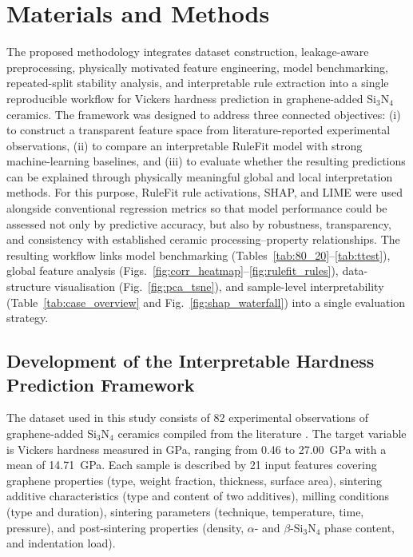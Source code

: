 \documentclass[pdflatex,sn-mathphys-num]{sn-jnl}%
\theoremstyle{thmstyleone}%
\theoremstyle{thmstyletwo}%
\theoremstyle{thmstylethree}%
\begin{document}
\section{Materials and Methods}
The proposed methodology integrates dataset construction, leakage-aware preprocessing, physically motivated feature engineering, model benchmarking, repeated-split stability analysis, and interpretable rule extraction into a single reproducible workflow for Vickers hardness prediction in graphene-added Si$_3$N$_4$ ceramics. The framework was designed to address three connected objectives: (i) to construct a transparent feature space from literature-reported experimental observations, (ii) to compare an interpretable RuleFit model with strong machine-learning baselines, and (iii) to evaluate whether the resulting predictions can be explained through physically meaningful global and local interpretation methods. For this purpose, RuleFit rule activations, SHAP, and LIME were used alongside conventional regression metrics so that model performance could be assessed not only by predictive accuracy, but also by robustness, transparency, and consistency with established ceramic processing--property relationships. The resulting workflow links model benchmarking (Tables~\ref{tab:80_20}--\ref{tab:ttest}), global feature analysis (Figs.~\ref{fig:corr_heatmap}--\ref{fig:rulefit_rules}), data-structure visualisation (Fig.~\ref{fig:pca_tsne}), and sample-level interpretability (Table~\ref{tab:case_overview} and Fig.~\ref{fig:shap_waterfall}) into a single evaluation strategy.



\subsection{Development of the Interpretable Hardness Prediction Framework}

The dataset used in this study consists of 82 experimental observations of graphene-added Si$_3$N$_4$ ceramics compiled from the literature \cite{qadir2024predicting}. The target variable is Vickers hardness measured in GPa, ranging from 0.46 to 27.00~GPa with a mean of 14.71~GPa. Each sample is described by 21 input features covering graphene properties (type, weight fraction, thickness, surface area), sintering additive characteristics (type and content of two additives), milling conditions (type and duration), sintering parameters (technique, temperature, time, pressure), and post-sintering properties (density, $\alpha$- and $\beta$-Si$_3$N$_4$ phase content, and indentation load).
\end{document}
